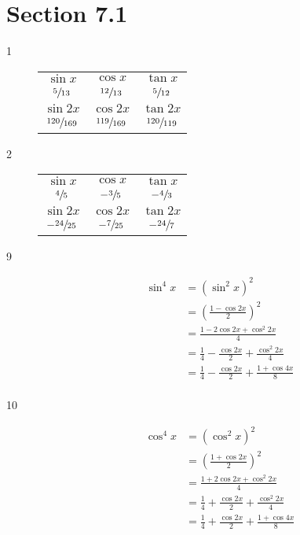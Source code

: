 \documentclass{exam}
\begin{document}
    \section{Section 7.1}
    \begin{description}

      \item[1] 
        \begin{tabular}[H]{ccc}
          \toprule
          $\sin x$           & $\cos x$           & $\tan x$      \\
          $\sfrac{5}{13}$    & $\sfrac{12}{13}$   & $\sfrac{5}{12}$ \\
          \midrule
          $\sin 2x$          & $\cos 2x$          & $\tan 2x$      \\
          $\sfrac{120}{169}$ & $\sfrac{119}{169}$ & $\sfrac{120}{119}$ \\
          \bottomrule
        \end{tabular}

      \item[2] 
        \begin{tabular}[H]{ccc}
          \toprule
          $\sin x$          & $\cos x$         & $\tan x$      \\
          $\sfrac{4}{5}$    & $- \sfrac{3}{5}$ & $-\sfrac{4}{3}$ \\
          \midrule
          $\sin 2x$         & $\cos 2x$        & $\tan 2x$      \\
          $-\sfrac{24}{25}$ & $-\sfrac{7}{25}$ & $-\sfrac{24}{7}$ \\
          \bottomrule
        \end{tabular}

      \item[9]
        \begin{align*}
          \sin^4 x & = \left( \sin^2 x \right)^2 \\
                   & = \left( \frac{1 - \cos 2x}{2} \right)^2 \\
                   & = \frac{1 - 2 \cos 2x + \cos^2 2x}{4} \\
                   &= \frac{1}{4} - \frac{\cos 2x}{2} + \frac{\cos^2 2x}{4} \\
                   &= \frac{1}{4} - \frac{\cos 2x}{2} + \frac{1 + \cos 4x}{8} \\
        \end{align*}

      \item[10]
        \begin{align*}
          \cos^4 x & = \left( \cos^2 x \right)^2 \\
                   & = \left( \frac{1 + \cos 2x}{2} \right)^2 \\
                   & = \frac{1 + 2 \cos 2x + \cos^2 2x}{4} \\
                   &= \frac{1}{4} + \frac{\cos 2x}{2} + \frac{\cos^2 2x}{4} \\
                   &= \frac{1}{4} + \frac{\cos 2x}{2} + \frac{1 + \cos 4x}{8} \\
        \end{align*}


\end{description}
\end{document}
